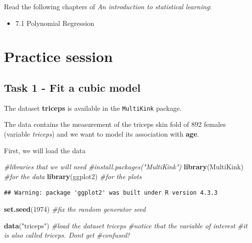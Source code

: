 \documentclass[
]{book}
\newenvironment{Shaded}{\begin{snugshade}}{\end{snugshade}}
\newcommand{\CommentTok}[1]{\textcolor[rgb]{0.56,0.35,0.01}{\textit{#1}}}
\newcommand{\DecValTok}[1]{\textcolor[rgb]{0.00,0.00,0.81}{#1}}
\newcommand{\FunctionTok}[1]{\textcolor[rgb]{0.13,0.29,0.53}{\textbf{#1}}}
\newcommand{\NormalTok}[1]{#1}
\newcommand{\StringTok}[1]{\textcolor[rgb]{0.31,0.60,0.02}{#1}}
\providecommand{\tightlist}{%
  \setlength{\itemsep}{0pt}\setlength{\parskip}{0pt}}
\begin{document}
Read the following chapters of \emph{An introduction to statistical learning}:

\begin{itemize}
\tightlist
\item
  7.1 Polynomial Regression
\end{itemize}

\section{Practice session}\label{PR3}

\subsection*{Task 1 - Fit a cubic model}\label{task-1---fit-a-cubic-model}

The dataset \textbf{triceps} is available in the \texttt{MultiKink} package.

The data contains the measurement of the triceps skin fold of 892 females
(variable \emph{triceps}) and we want to model its association with \textbf{age}.

First, we will load the data

\begin{Shaded}
\begin{Highlighting}[]
\CommentTok{\#libraries that we will need}
\CommentTok{\#install.packages("MultiKink")  }
\FunctionTok{library}\NormalTok{(MultiKink) }\CommentTok{\#for the data}
\FunctionTok{library}\NormalTok{(ggplot2)   }\CommentTok{\#for the plots}
\end{Highlighting}
\end{Shaded}

\begin{verbatim}
## Warning: package 'ggplot2' was built under R version 4.3.3
\end{verbatim}

\begin{Shaded}
\begin{Highlighting}[]
\FunctionTok{set.seed}\NormalTok{(}\DecValTok{1974}\NormalTok{)     }\CommentTok{\#fix the random generator seed }

\FunctionTok{data}\NormalTok{(}\StringTok{"triceps"}\NormalTok{)   }\CommentTok{\#load the dataset triceps}
                  \CommentTok{\#notice that the variable of interest}
                  \CommentTok{\#it is also called triceps. Don\textquotesingle{}t get }
                  \CommentTok{\#confused!}
\end{Highlighting}
\end{Shaded}
\end{document}
